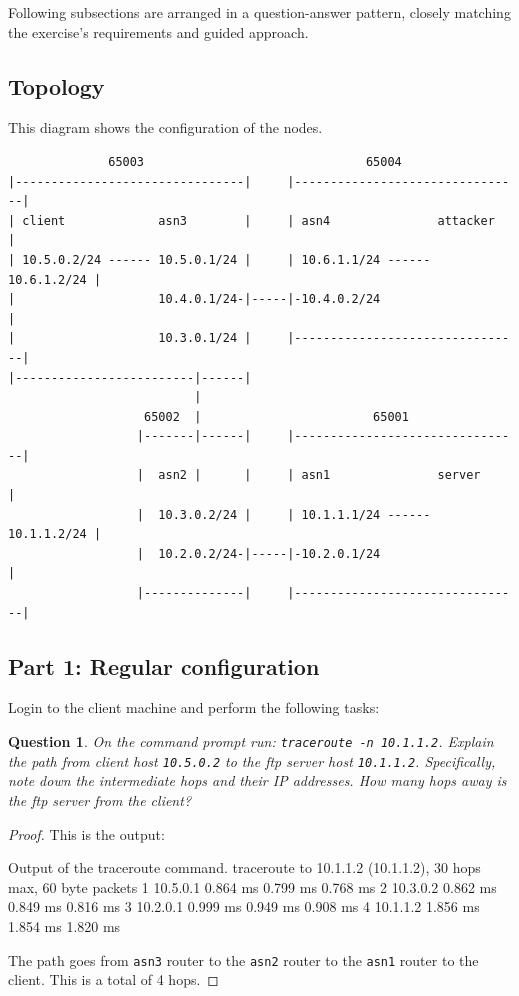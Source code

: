 \documentclass[a4paper,11pt,hidelinks]{article}
\newtheorem{theorem}{Question}[subsection]
\begin{document}
Following subsections are arranged in a question-answer pattern, closely matching the exercise's requirements and guided approach.

\subsection{Topology}

This diagram shows the configuration of the nodes.

\begin{verbatim}    
              65003                               65004
|--------------------------------|     |--------------------------------|
| client             asn3        |     | asn4               attacker    |
| 10.5.0.2/24 ------ 10.5.0.1/24 |     | 10.6.1.1/24 ------ 10.6.1.2/24 |
|                    10.4.0.1/24-|-----|-10.4.0.2/24                    |
|                    10.3.0.1/24 |     |--------------------------------|
|-------------------------|------| 
                          |
                   65002  |                        65001
                  |-------|------|     |--------------------------------|
                  |  asn2 |      |     | asn1               server      |
                  |  10.3.0.2/24 |     | 10.1.1.1/24 ------ 10.1.1.2/24 |
                  |  10.2.0.2/24-|-----|-10.2.0.1/24                    |
                  |--------------|     |--------------------------------|
\end{verbatim}

\clearpage
\newpage
\subsection{Part 1: Regular configuration}

Login to the client machine and perform the following tasks:

\begin{theorem}
    On the command prompt run: \verb=traceroute -n 10.1.1.2=. Explain the path from client host \verb=10.5.0.2= to the ftp server host \verb=10.1.1.2=. Specifically, note down the intermediate hops and their IP addresses. How many hops away is the ftp server from the client?
\end{theorem}

\begin{proof}
    This is the output:

\begin{code}{Output of the traceroute command.}
traceroute to 10.1.1.2 (10.1.1.2), 30 hops max, 60 byte packets
 1  10.5.0.1  0.864 ms  0.799 ms  0.768 ms
 2  10.3.0.2  0.862 ms  0.849 ms  0.816 ms
 3  10.2.0.1  0.999 ms  0.949 ms  0.908 ms
 4  10.1.1.2  1.856 ms  1.854 ms  1.820 ms
\end{code}

    The path goes from \verb=asn3= router to the \verb=asn2= router to the \verb=asn1= router to the client. This is a total of 4 hops.
\end{proof}
\end{document}
